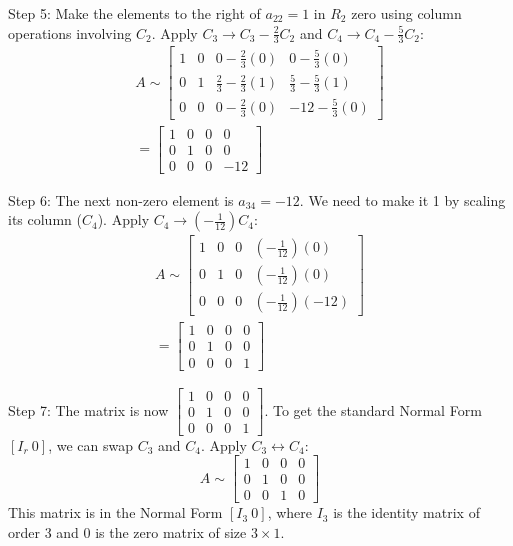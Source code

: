 \documentclass{article}
\begin{document}
Step 5: Make the elements to the right of $a_{22}=1$ in $R_2$ zero using column operations involving $C_2$.
Apply $C_3 \to C_3 - \frac{2}{3}C_2$ and $C_4 \to C_4 - \frac{5}{3}C_2$:
\begin{align*} A \sim \begin{bmatrix} 1 & 0 & 0 - \frac{2}{3}(0) & 0 - \frac{5}{3}(0) \\ 0 & 1 & \frac{2}{3} - \frac{2}{3}(1) & \frac{5}{3} - \frac{5}{3}(1) \\ 0 & 0 & 0 - \frac{2}{3}(0) & -12 - \frac{5}{3}(0) \end{bmatrix} \\ = \begin{bmatrix} 1 & 0 & 0 & 0 \\ 0 & 1 & 0 & 0 \\ 0 & 0 & 0 & -12 \end{bmatrix}\end{align*}

Step 6: The next non-zero element is $a_{34}=-12$. We need to make it 1 by scaling its column ($C_4$).
Apply $C_4 \to (-\frac{1}{12})C_4$:
\begin{align*} A \sim \begin{bmatrix} 1 & 0 & 0 & (-\frac{1}{12})(0) \\ 0 & 1 & 0 & (-\frac{1}{12})(0) \\ 0 & 0 & 0 & (-\frac{1}{12})(-12) \end{bmatrix} \\ = \begin{bmatrix} 1 & 0 & 0 & 0 \\ 0 & 1 & 0 & 0 \\ 0 & 0 & 0 & 1 \end{bmatrix}\end{align*}

Step 7: The matrix is now $\begin{bmatrix} 1 & 0 & 0 & 0 \\ 0 & 1 & 0 & 0 \\ 0 & 0 & 0 & 1 \end{bmatrix}$. To get the standard Normal Form $[I_r \ 0]$, we can swap $C_3$ and $C_4$.
Apply $C_3 \leftrightarrow C_4$:
\[ A \sim \begin{bmatrix} 1 & 0 & 0 & 0 \\ 0 & 1 & 0 & 0 \\ 0 & 0 & 1 & 0 \end{bmatrix} \]
This matrix is in the Normal Form $[I_3 \ 0]$, where $I_3$ is the identity matrix of order 3 and 0 is the zero matrix of size $3 \times 1$.
\end{document}
